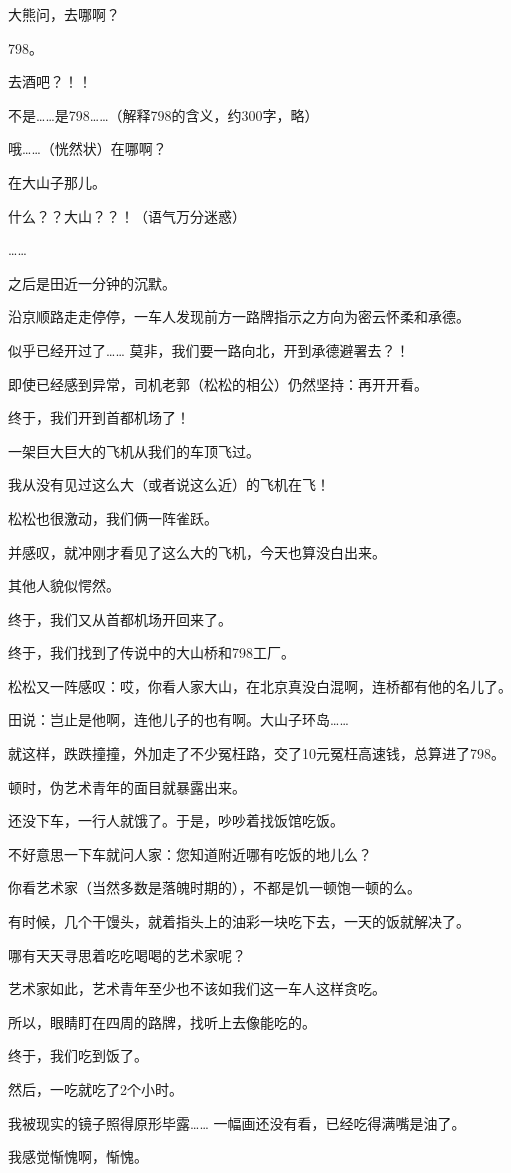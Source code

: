 		大熊问，去哪啊？\par
		798。\par
		去酒吧？！！\par
		不是……是798……（解释798的含义，约300字，略）\par
		哦……（恍然状）在哪啊？\par
		在大山子那儿。\par
		什么？？大山？？！（语气万分迷惑）\par
		……\par
		之后是田近一分钟的沉默。


		沿京顺路走走停停，一车人发现前方一路牌指示之方向为密云怀柔和承德。\par
		似乎已经开过了…… 莫非，我们要一路向北，开到承德避署去？！\par
		即使已经感到异常，司机老郭（松松的相公）仍然坚持：再开开看。\par
		终于，我们开到首都机场了！\par
		一架巨大巨大的飞机从我们的车顶飞过。\par
		我从没有见过这么大（或者说这么近）的飞机在飞！\par
		松松也很激动，我们俩一阵雀跃。\par
		并感叹，就冲刚才看见了这么大的飞机，今天也算没白出来。\par
		其他人貌似愕然。\par
		终于，我们又从首都机场开回来了。\par
		终于，我们找到了传说中的大山桥和798工厂。\par
		松松又一阵感叹：哎，你看人家大山，在北京真没白混啊，连桥都有他的名儿了。\par
		田说：岂止是他啊，连他儿子的也有啊。大山子环岛……


		就这样，跌跌撞撞，外加走了不少冤枉路，交了10元冤枉高速钱，总算进了798。\par
		顿时，伪艺术青年的面目就暴露出来。\par
		还没下车，一行人就饿了。于是，吵吵着找饭馆吃饭。\par
		不好意思一下车就问人家：您知道附近哪有吃饭的地儿么？\par
		你看艺术家（当然多数是落魄时期的），不都是饥一顿饱一顿的么。\par
		有时候，几个干馒头，就着指头上的油彩一块吃下去，一天的饭就解决了。\par
		哪有天天寻思着吃吃喝喝的艺术家呢？\par
		艺术家如此，艺术青年至少也不该如我们这一车人这样贪吃。\par
		所以，眼睛盯在四周的路牌，找听上去像能吃的。\par
		终于，我们吃到饭了。\par
		然后，一吃就吃了2个小时。\par
		我被现实的镜子照得原形毕露…… 一幅画还没有看，已经吃得满嘴是油了。\par
		我感觉惭愧啊，惭愧。


